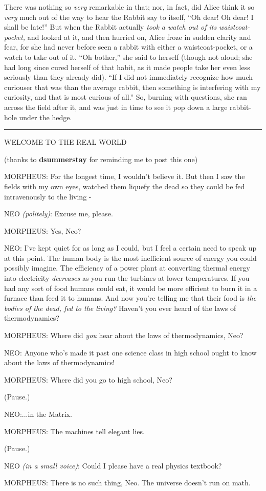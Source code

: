There was nothing so \emph{very} remarkable in that; nor, in fact, did Alice think it so \emph{very} much out of the way to hear the Rabbit say to itself, ``Oh dear! Oh dear! I shall be late!'' But when the Rabbit actually \emph{took a watch out of its waistcoat- pocket,} and looked at it, and then hurried on, Alice froze in sudden clarity and fear, for she had never before seen a rabbit with either a waistcoat-pocket, or a watch to take out of it. ``Oh bother,'' she said to herself (though not aloud; she had long since cured herself of that habit, as it made people take her even less seriously than they already did). ``If I did not immediately recognize how much curiouser that was than the average rabbit, then something is interfering with my curiosity, and that is most curious of all.'' So, burning with questions, she ran across the field after it, and was just in time to see it pop down a large rabbit-hole under the hedge.

\begin{center}\rule{3in}{0.4pt}\end{center}

WELCOME TO THE REAL WORLD

(thanks to \textbf{dsummerstay} for reminding me to post this one)

MORPHEUS: For the longest time, I wouldn't believe it. But then I saw the fields with my own eyes, watched them liquefy the dead so they could be fed intravenously to the living -

NEO \emph{(politely)}: Excuse me, please.

MORPHEUS: Yes, Neo?

NEO: I've kept quiet for as long as I could, but I feel a certain need to speak up at this point. The human body is the most inefficient source of energy you could possibly imagine. The efficiency of a power plant at converting thermal energy into electricity \emph{decreases} as you run the turbines at lower temperatures. If you had any sort of food humans could eat, it would be more efficient to burn it in a furnace than feed it to humans. And now you're telling me that their food is \emph{the bodies of the dead, fed to the living?} Haven't you ever heard of the laws of thermodynamics?

MORPHEUS: Where did \emph{you} hear about the laws of thermodynamics, Neo?

NEO: Anyone who's made it past one science class in high school ought to know about the laws of thermodynamics!

MORPHEUS: Where did you go to high school, Neo?

(Pause.)

NEO:...in the Matrix.

MORPHEUS: The machines tell elegant lies.

(Pause.)

NEO \emph{(in a small voice)}: Could I please have a real physics textbook?

MORPHEUS: There is no such thing, Neo. The universe doesn't run on math.
